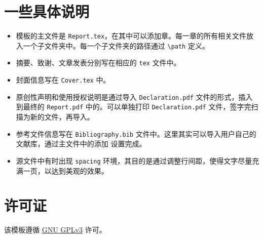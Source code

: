 \section*{一些具体说明}
\begin{itemize}
\item 模板的主文件是 \texttt{Report.tex}，在其中可以添加章。每一章的所有相关文件放入一个子文件夹中。每一个子文件夹的路径通过 \verb"\path" 定义。
\item 摘要、致谢、文章发表分别写在相应的 \texttt{tex} 文件中。 
\item 封面信息写在 \texttt{Cover.tex} 中。
\item 原创性声明和使用授权说明是通过导入 \texttt{Declaration.pdf} 文件的形式，插入到最终的 \texttt{Report.pdf} 中的。可以单独打印 \texttt{Declaration.pdf} 文件，签字完扫描为新的文件，再导入。
\item 参考文件信息写在 \texttt{Bibliography.bib} 文件中。这里其实可以导入用户自己的文献库，通过主文件中的添加 \verb"" 设置完成。
\item 源文件中有时出现 \texttt{spacing} 环境，其目的是通过调整行间距，使得文字尽量充满一页，以达到美观的效果。
\end{itemize}

\section*{许可证}
该模板遵循 \href{https://choosealicense.com/licenses/gpl-3.0/}{GNU GPLv3} 许可。
